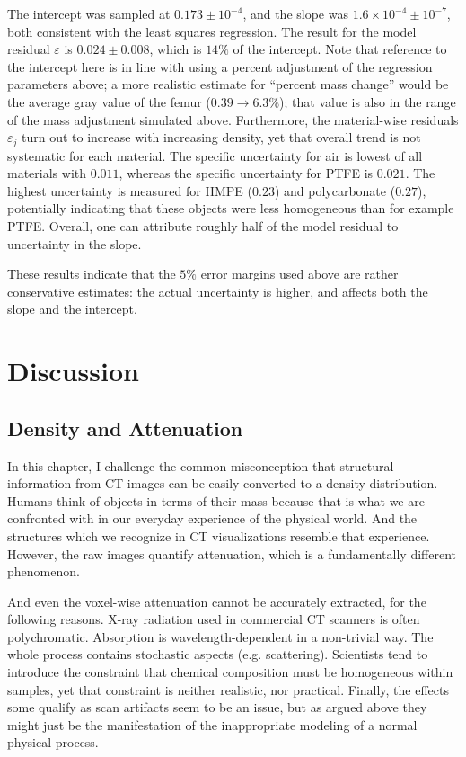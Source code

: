 The intercept was sampled at \(0.173\pm 10^{-4}\), and the slope was \(1.6\times 10^{-4} \pm 10^{-7}\), both consistent with the least squares regression.
The result for the model residual \(\varepsilon\) is \(0.024 \pm 0.008\), which is \(14\%\) of the intercept.
Note that reference to the intercept here is in line with using a percent adjustment of the regression parameters above; a more realistic estimate for ``percent mass change'' would be the average gray value of the femur (\(0.39 \longrightarrow 6.3\%\)); that value is also in the range of the mass adjustment simulated above.
Furthermore, the material-wise residuals \(\varepsilon_{j}\) turn out to increase with increasing density, yet that overall trend is not systematic for each material.
The specific uncertainty for air is lowest of all materials with \(0.011\), whereas the specific uncertainty for PTFE is \(0.021\).
The highest uncertainty is measured for HMPE (\(0.23\)) and polycarbonate (\(0.27\)), potentially indicating that these objects were less homogeneous than for example PTFE.
Overall, one can attribute roughly half of the model residual to uncertainty in the slope.

These results indicate that the \(5\%\) error margins used above are rather conservative estimates: the actual uncertainty is higher, and affects both the slope and the intercept.


\section{Discussion}
\label{sec:org3c02141}
\subsection{Density and Attenuation}
\label{sec:org5e34015}
In this chapter, I challenge the common misconception that structural information from CT images can be easily converted to a density distribution.
Humans think of objects in terms of their mass because that is what we are confronted with in our everyday experience of the physical world.
And the structures which we recognize in CT visualizations resemble that experience.
However, the raw images quantify attenuation, which is a fundamentally different phenomenon.


And even the voxel-wise attenuation cannot be accurately extracted, for the following reasons.
X-ray radiation used in commercial CT scanners is often polychromatic.
Absorption is wavelength-dependent in a non-trivial way.
The whole process contains stochastic aspects (e.g. scattering).
Scientists tend to introduce the constraint that chemical composition must be homogeneous within samples, yet that constraint is neither realistic, nor practical.
Finally, the effects some qualify as scan artifacts seem to be an issue, but as argued above they might just be the manifestation of the inappropriate modeling of a normal physical process.



